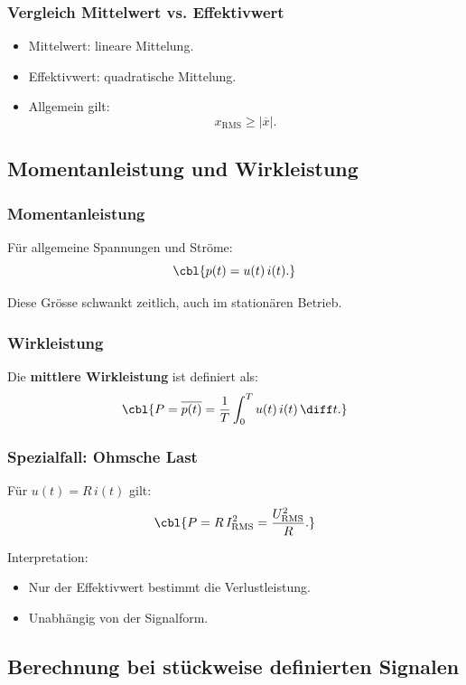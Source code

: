 \subsubsection{Vergleich Mittelwert vs. Effektivwert}

\begin{itemize}
    \item Mittelwert: lineare Mittelung.
    \item Effektivwert: quadratische Mittelung.
    \item Allgemein gilt:
    \[
    x_{\mathrm{RMS}} \ge |\overline{x}|.
    \]
\end{itemize}

\subsection{Momentanleistung und Wirkleistung}

\subsubsection{Momentanleistung}

Für allgemeine Spannungen und Ströme:
\[
\cbl{p(t) = u(t)\, i(t).}
\]

Diese Grösse schwankt zeitlich, auch im stationären Betrieb.

\subsubsection{Wirkleistung}

Die \textbf{mittlere Wirkleistung} ist definiert als:
\[
\cbl{P = \overline{p(t)} = \frac{1}{T} \int_{0}^{T} u(t)\,i(t)\,\diff t.}
\]

\subsubsection{Spezialfall: Ohmsche Last}

Für $u(t) = R\, i(t)$ gilt:
\[
\cbl{P = R \, I_{\mathrm{RMS}}^2 = \frac{U_{\mathrm{RMS}}^2}{R}.}
\]

Interpretation:
\begin{itemize}
    \item Nur der Effektivwert bestimmt die Verlustleistung.
    \item Unabhängig von der Signalform.
\end{itemize}

\subsection{Berechnung bei stückweise definierten Signalen}

